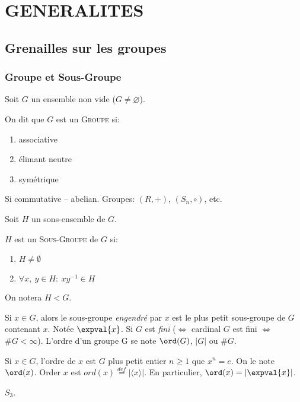 \chapter{GENERALITES} %
\label{cha:generalites}

\section{Grenailles sur les groupes}
\subsection{Groupe et Sous-Groupe} %
\label{sub:groupe_et_sous_groupe}

Soit $G$ un ensemble non vide ($G\neq\varnothing$).
\begin{definition}
On dit que $G$ est un \textsc{Groupe} si:
\begin{enumerate}
\item associative 
\item élimant neutre
\item symétrique
\end{enumerate}
\end{definition}

Si commutative -- abelian. Groupes: $(R, +)$, $(S_n, \circ)$, etc.

Soit $H$ un sons-ensemble de $G$.
\begin{definition}
	$H$ est un \textsc{Sous-Groupe} de $G$ si:
	\begin{enumerate}
		\item $H\neq\emptyset$
		\item $\forall x,\ y \in H:\ xy^{-1}\in H$
	\end{enumerate}
	On notera $H < G$.
\end{definition}

Si $x\in G$, alors le sous-groupe \emph{engendré} par $x$ est le plus petit sous-groupe de $G$ contenant $x$. Notée $\expval{x}$. Si $G$ est \emph{fini} ($\Leftrightarrow$ cardinal $G$ est fini $\Leftrightarrow$ $\#G<\infty$).  L'ordre d'un groupe G se note $\ord(G)$, $|G|$ ou $\#G$.

Si  $x\in G$, l'ordre de $x$ est $G$ plus petit entier $n\geq 1$ que $x^n = e$. On le note $\ord(x)$. Order $x$ est $ord(x)\overset{def}{=}|\langle x\rangle|$. En particulier, $\ord(x)=|\expval{x}|$.

\begin{examplebox}
	$S_3$.
\end{examplebox}

